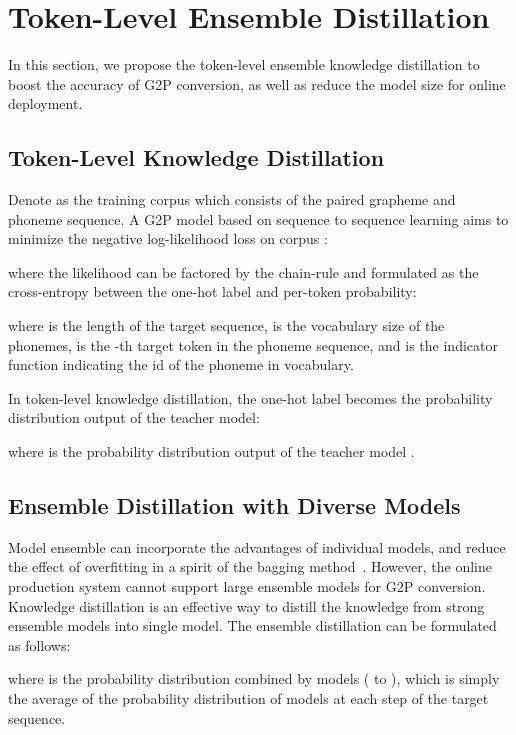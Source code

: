 \documentclass[a4paper]{article}
\begin{document}
\section{Token-Level Ensemble Distillation}
In this section, we propose the token-level ensemble knowledge distillation to boost the accuracy of G2P conversion, as well as reduce the model size for online deployment.

\subsection{Token-Level Knowledge Distillation}




Denote  as the training corpus which consists of the paired grapheme and phoneme sequence. A G2P model based on sequence to sequence learning aims to minimize the negative log-likelihood loss on corpus :

where the likelihood  can be factored by the chain-rule and formulated as the cross-entropy between the one-hot label and per-token probability:  

where  is the length of the target sequence,  is the vocabulary size of the phonemes,  is the -th target token in the phoneme sequence, and  is the indicator function indicating the id of the phoneme in vocabulary.

In token-level knowledge distillation, the one-hot label becomes the probability distribution output of the teacher model:

where  is the probability distribution output of the teacher model . 

\subsection{Ensemble Distillation with Diverse Models}
Model ensemble can incorporate the advantages of individual models, and reduce the effect of overfitting in a spirit of the bagging method~\cite{dietterich2000ensemble}. However, the online production system cannot support large ensemble models for G2P conversion. Knowledge distillation is an effective way to distill the knowledge from strong ensemble models into single model. The ensemble distillation can be formulated as follows:



where  is the probability distribution combined by  models ( to ), which is simply the average of the probability distribution of  models at each step of the target sequence.
 
\end{document}
